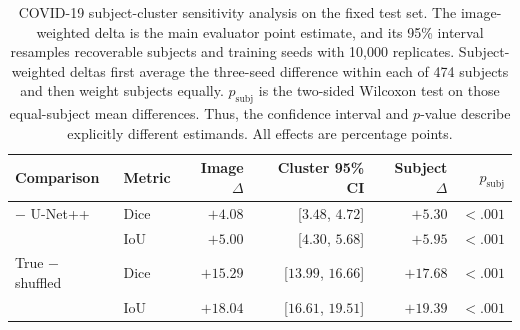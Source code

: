 \begin{table}[htbp]
\centering
\caption{COVID-19 subject-cluster sensitivity analysis on the fixed test set.
The image-weighted delta is the main evaluator point estimate, and
its 95\% interval resamples recoverable subjects and training seeds with 10,000
replicates. Subject-weighted deltas first average the three-seed difference
within each of 474 subjects and then weight subjects equally. $p_{\mathrm{subj}}$
is the two-sided Wilcoxon test on those equal-subject mean differences. Thus,
the confidence interval and $p$-value describe explicitly different estimands.
All effects are percentage points.}
\label{tab:covid_subject_cluster}
\scriptsize
\setlength{\tabcolsep}{3.0pt}
\begin{tabular}{@{}llrrrr@{}}
\toprule
Comparison & Metric & Image $\Delta$ & Cluster 95\% CI & Subject $\Delta$ & $p_{\mathrm{subj}}$ \\
\midrule
\methodname{} $-$ U-Net++ & Dice & $+4.08$ & [$3.48$, $4.72$] & $+5.30$ & $<.001$ \\
                 & IoU  & $+5.00$ & [$4.30$, $5.68$] & $+5.95$ & $<.001$ \\
True $-$ shuffled & Dice & $+15.29$ & [$13.99$, $16.66$] & $+17.68$ & $<.001$ \\
                  & IoU  & $+18.04$ & [$16.61$, $19.51$] & $+19.39$ & $<.001$ \\
\bottomrule
\end{tabular}
\end{table}
